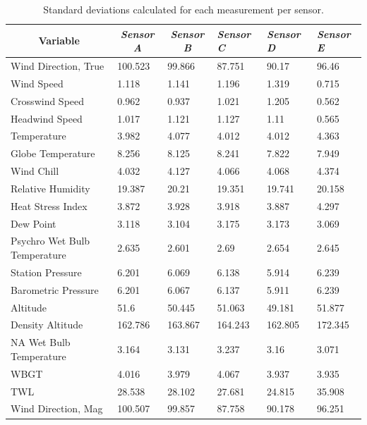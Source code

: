 \documentclass[a4paper,12pt]{article} %
\begin{document}
\begin{enumerate}
\begin{table}[H]
\centering
\caption{Standard deviations calculated for each measurement per sensor.}
\begin{tabular}{llllll}
\multicolumn{1}{c}{\textbf{Variable}} & \multicolumn{1}{c}{\textit{Sensor A}} & \multicolumn{1}{c}{\textit{Sensor B}} & \textit{Sensor C} & \textit{Sensor D} & \textit{Sensor E}  \\ \hline
Wind Direction‚ True             & 100.523   & 99.866    & 87.751    & 90.17     & 96.46     \\
Wind Speed                   & 1.118     & 1.141     & 1.196     & 1.319     & 0.715     \\
Crosswind Speed              & 0.962     & 0.937     & 1.021     & 1.205     & 0.562     \\
Headwind Speed               & 1.017     & 1.121     & 1.127     & 1.11      & 0.565     \\
Temperature                  & 3.982     & 4.077     & 4.012     & 4.012     & 4.363     \\
Globe Temperature            & 8.256     & 8.125     & 8.241     & 7.822     & 7.949     \\
Wind Chill                   & 4.032     & 4.127     & 4.066     & 4.068     & 4.374     \\
Relative Humidity            & 19.387    & 20.21     & 19.351    & 19.741    & 20.158    \\
Heat Stress Index            & 3.872     & 3.928     & 3.918     & 3.887     & 4.297     \\
Dew Point                    & 3.118     & 3.104     & 3.175     & 3.173     & 3.069     \\
Psychro Wet Bulb Temperature & 2.635     & 2.601     & 2.69      & 2.654     & 2.645     \\
Station Pressure             & 6.201     & 6.069     & 6.138     & 5.914     & 6.239     \\
Barometric Pressure          & 6.201     & 6.067     & 6.137     & 5.911     & 6.239     \\
Altitude                     & 51.6      & 50.445    & 51.063    & 49.181    & 51.877    \\
Density Altitude             & 162.786   & 163.867   & 164.243   & 162.805   & 172.345   \\
NA Wet Bulb Temperature      & 3.164     & 3.131     & 3.237     & 3.16      & 3.071     \\
WBGT                         & 4.016     & 3.979     & 4.067     & 3.937     & 3.935     \\
TWL                          & 28.538    & 28.102    & 27.681    & 24.815    & 35.908    \\
Wind Direction‚ Mag              & 100.507   & 99.857    & 87.758    & 90.178    & 96.251   
\end{tabular}
\label{std-table}
\end{table}


\end{enumerate}
\end{document}
